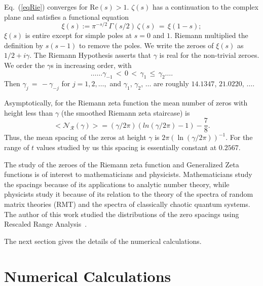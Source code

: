 \documentclass[twoside]{article}
\begin{document}
Eq.~(\ref{eqRie})  converges for $\mathrm{Re} (s) > 1$.  
 $\zeta ( s )$ has a  continuation
to the complex plane and satisfies a functional equation \cite{Riemann(1858),Riemann(1892),Titchmarsh(1986),Edwards(1974)}
\begin{equation}  
\xi(s):= \pi^{-s/2} \, \Gamma (s/2) \, \zeta ( s ) \, = \, \xi ( 1 - s );
\label{eq:func}
\end{equation}
$\xi(s)$ is entire except for simple poles at $s = 0$ and $1$. Riemann
multiplied the definition by $s(s-1)$ to remove the poles. We
write the zeroes of $\xi(s)$ as $1/2 + i \gamma$. The Riemann Hypothesis  
asserts that $\gamma$ is real for the non-trivial zeroes.
We order the $\gamma$s in increasing order, with 
\begin{equation}
\ldots \ldots \gamma_{-1} \, < \, 0 \, < \, 
\gamma_1 \, \leq \, \gamma_2 \ldots. 
\end{equation}
Then $\gamma_j \, = \, - \gamma_{-j}$ for $j = 1, 2, \ldots,$ 
and    $\gamma_1$, $\gamma_2$, $\ldots$  are roughly
$14.1347$, $21.0220$, $\ldots$.


Asymptotically, for the Riemann zeta function the mean number of 
zeros with height less than $\gamma$ (the smoothed Riemann zeta staircase)
is~\cite{Edwards(1974)}
\begin{equation}  
<\mathcal{N_R} (\gamma)> = (\gamma/2\pi)(ln(\gamma/2\pi)-1)-\frac{7}{8}.
\label{eq:Rnumber}
\end{equation}
Thus, the mean spacing of the zeros at height $\gamma$ is 
$2\pi(\ln (\gamma/2\pi))^{-1}$. For the range of $t$ values
studied by us this spacing is essentially constant at $0.2567$.

The study of the zeroes of the Riemann zeta function and Generalized 
Zeta functions is of interest to mathematicians and physicists. Mathematicians 
study the spacings because of its applications to analytic number theory, 
while physicists study it because of its  relation 
to the theory of the spectra of random matrix theories (RMT) 
and the spectra of classically chaotic quantum systems. 
The author of this work studied the distributions of the zero 
spacings using Rescaled Range Analysis~\cite{os6}.


The next section gives the details of the numerical calculations.

\section{\label{sec3}Numerical Calculations}
\end{document}
